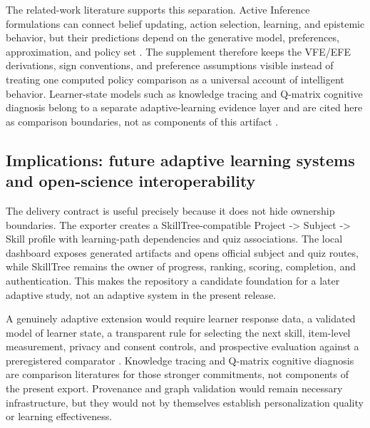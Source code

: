 \documentclass[
  english,
]{article}
\begin{document}
The related-work literature supports this separation. Active Inference
formulations can connect belief updating, action selection, learning,
and epistemic behavior, but their predictions depend on the generative
model, preferences, approximation, and policy set
\citep{rao1999predictive, friston2013life, ramstead2018answering, friston2019particular}.
The supplement therefore keeps the VFE/EFE derivations, sign
conventions, and preference assumptions visible instead of treating one
computed policy comparison as a universal account of intelligent
behavior. Learner-state models such as knowledge tracing and Q-matrix
cognitive diagnosis belong to a separate adaptive-learning evidence
layer and are cited here as comparison boundaries, not as components of
this artifact
\citep{piech2015deep_knowledge_tracing, tao2024q_matrix_constraint}.

\subsection{Implications: future adaptive learning systems and
open-science
interoperability}\label{implications-future-adaptive-learning-systems-and-open-science-interoperability}

The delivery contract is useful precisely because it does not hide
ownership boundaries. The exporter creates a SkillTree-compatible
Project -\textgreater{} Subject -\textgreater{} Skill profile with
learning-path dependencies and quiz associations. The local dashboard
exposes generated artifacts and opens official subject and quiz routes,
while SkillTree remains the owner of progress, ranking, scoring,
completion, and authentication. This makes the repository a candidate
foundation for a later adaptive study, not an adaptive system in the
present release.

A genuinely adaptive extension would require learner response data, a
validated model of learner state, a transparent rule for selecting the
next skill, item-level measurement, privacy and consent controls, and
prospective evaluation against a preregistered comparator
\citep{doignon1985knowledge_spaces, fu2025curriculum_aware_gncd, designbasedresearchcollective2003, liu2023_learning_analytics_privacy, piech2015deep_knowledge_tracing, tao2024q_matrix_constraint}.
Knowledge tracing and Q-matrix cognitive diagnosis are comparison
literatures for those stronger commitments, not components of the
present export. Provenance and graph validation would remain necessary
infrastructure, but they would not by themselves establish
personalization quality or learning effectiveness.
\end{document}
